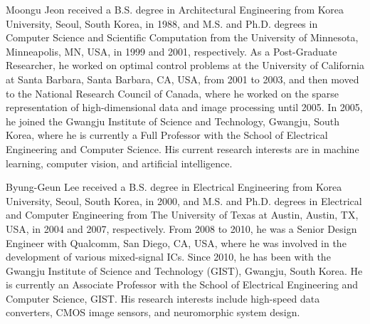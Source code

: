 \documentclass[journal]{IEEEtran}
\begin{document}
\begin{IEEEbiography}{Moongu Jeon} received a B.S. degree in Architectural Engineering from Korea University, Seoul, South Korea, in 1988, and M.S. and Ph.D.
degrees in Computer Science and Scientific Computation from the University
of Minnesota, Minneapolis, MN, USA, in 1999 and 2001, respectively. As
a Post-Graduate Researcher, he worked on optimal control problems at the
University of California at Santa Barbara, Santa Barbara, CA, USA, from
2001 to 2003, and then moved to the National Research Council of Canada,
where he worked on the sparse representation of high-dimensional data and
image processing until 2005. In 2005, he joined the Gwangju Institute of
Science and Technology, Gwangju, South Korea, where he is currently a Full
Professor with the School of Electrical Engineering and Computer Science.
His current research interests are in machine learning, computer vision, and
artificial intelligence.
\end{IEEEbiography}

\begin{IEEEbiography}{Byung-Geun Lee } received a B.S. degree in Electrical Engineering from Korea University, Seoul, South Korea, in 2000, and M.S. and Ph.D. degrees in Electrical and Computer Engineering from The University of Texas at Austin, Austin, TX, USA, in 2004 and 2007, respectively. From 2008 to 2010, he was a Senior Design Engineer with Qualcomm, San Diego, CA, USA, where he was involved in the development of various mixed-signal ICs. Since 2010, he has been with the Gwangju Institute of Science and Technology (GIST), Gwangju, South Korea. He is currently an Associate Professor with the School of Electrical Engineering and Computer Science, GIST. His research interests include high-speed data converters, CMOS image sensors, and neuromorphic system design.
\end{IEEEbiography}
\end{document}
